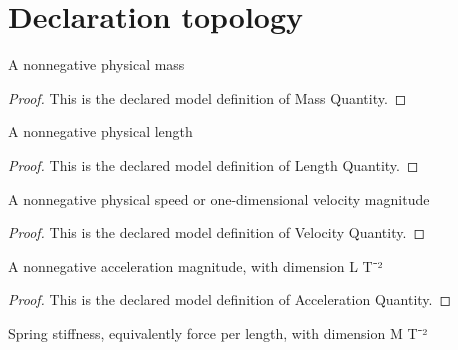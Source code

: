 \section{Declaration topology}
\begin{definition}
  \label{def:physics:phyx-mini-0281:phyxminiproblems-problemphyxmini0281-massquantity}
  A nonnegative physical mass
\end{definition}
\begin{proof}
  This is the declared model definition of Mass Quantity.
\end{proof}
\begin{definition}
  \label{def:physics:phyx-mini-0281:phyxminiproblems-problemphyxmini0281-lengthquantity}
  A nonnegative physical length
\end{definition}
\begin{proof}
  This is the declared model definition of Length Quantity.
\end{proof}
\begin{definition}
  \label{def:physics:phyx-mini-0281:phyxminiproblems-problemphyxmini0281-velocityquantity}
  A nonnegative physical speed or one-dimensional velocity magnitude
\end{definition}
\begin{proof}
  This is the declared model definition of Velocity Quantity.
\end{proof}
\begin{definition}
  \label{def:physics:phyx-mini-0281:phyxminiproblems-problemphyxmini0281-accelerationquantity}
  A nonnegative acceleration magnitude, with dimension L T⁻²
\end{definition}
\begin{proof}
  This is the declared model definition of Acceleration Quantity.
\end{proof}
\begin{definition}
  \label{def:physics:phyx-mini-0281:phyxminiproblems-problemphyxmini0281-springstiffnessquantity}
  Spring stiffness, equivalently force per length, with dimension M T⁻²
\end{definition}
